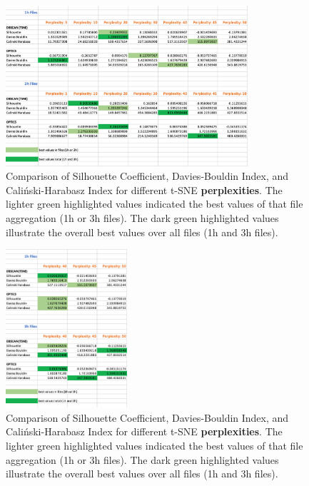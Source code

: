 \begin{figure}
  \centering
  \includegraphics[width=0.8\textwidth]{./images/tsneParametersTest/perplexity/perplexityEvaluationScores.png}
  \caption{Comparison of Silhouette Coefficient, Davies-Bouldin Index, and Caliński-Harabasz Index for different t-SNE \textbf{perplexities}. The lighter green highlighted values indicated the best values of that file aggregation (1h or 3h files). The dark green highlighted values illustrate the overall best values over all files (1h and 3h files).}
  \label{figure:perplexityEvaluationScores}
\end{figure}


\begin{figure}
  \centering
  \includegraphics[width=0.4\textwidth]{./images/tsneParametersTest/perplexity/perplexityEvaluationScoresDetailed.png}
  \caption{Comparison of Silhouette Coefficient, Davies-Bouldin Index, and Caliński-Harabasz Index for different t-SNE \textbf{perplexities}. The lighter green highlighted values indicated the best values of that file aggregation (1h or 3h files). The dark green highlighted values illustrate the overall best values over all files (1h and 3h files).}
  \label{figure:perplexityEvaluationScoresDetailed}
\end{figure}


